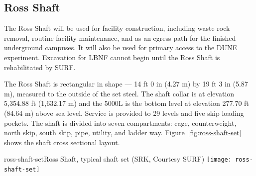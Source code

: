 \subsection{Ross Shaft}
\label{sec:fscf-und-shafts-ross}

The Ross Shaft will be used for facility construction, including waste rock removal, routine facility maintenance, and as an egress path for the finished underground campuses. It will also be used for primary access to the DUNE experiment. Excavation for LBNF cannot begin until the Ross Shaft is rehabilitated by  SURF.

The Ross Shaft is rectangular in shape --- 14 ft 0 in (4.27 m) by 19 ft 3 in (5.87 m), measured to the outside of the set steel. The shaft collar is at elevation 5,354.88 ft (1,632.17 m) and the 5000L is the bottom level at elevation 277.70 ft (84.64 m) above sea level. 
 Service is provided to 29 levels and five skip loading pockets. The shaft is divided into seven compartments: cage, counterweight, north skip, south skip, pipe, utility, and ladder way. Figure~\ref{fig:ross-shaft-set} shows the shaft cross sectional layout. %


\begin{cdrfigure}{ross-shaft-set}{Ross Shaft, typical shaft set (SRK, Courtesy SURF)}
\texttt{[image: ross-shaft-set]}
\end{cdrfigure}

